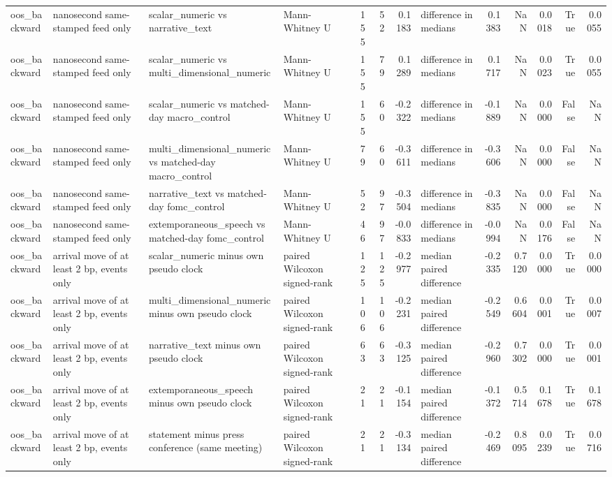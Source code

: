 \begin{tabular}{llllrrrlrrrrr}
oos_backward & nanosecond same-stamped feed only & scalar_numeric vs narrative_text & Mann-Whitney U & 155 & 52 & 0.1183 & difference in medians & 0.1383 & NaN & 0.0018 & True & 0.0055 \\
oos_backward & nanosecond same-stamped feed only & scalar_numeric vs multi_dimensional_numeric & Mann-Whitney U & 155 & 79 & 0.1289 & difference in medians & 0.1717 & NaN & 0.0023 & True & 0.0055 \\
oos_backward & nanosecond same-stamped feed only & scalar_numeric vs matched-day macro_control & Mann-Whitney U & 155 & 60 & -0.2322 & difference in medians & -0.1889 & NaN & 0.0000 & False & NaN \\
oos_backward & nanosecond same-stamped feed only & multi_dimensional_numeric vs matched-day macro_control & Mann-Whitney U & 79 & 60 & -0.3611 & difference in medians & -0.3606 & NaN & 0.0000 & False & NaN \\
oos_backward & nanosecond same-stamped feed only & narrative_text vs matched-day fomc_control & Mann-Whitney U & 52 & 97 & -0.3504 & difference in medians & -0.3835 & NaN & 0.0000 & False & NaN \\
oos_backward & nanosecond same-stamped feed only & extemporaneous_speech vs matched-day fomc_control & Mann-Whitney U & 46 & 97 & -0.0833 & difference in medians & -0.0994 & NaN & 0.0176 & False & NaN \\
oos_backward & arrival move of at least 2 bp, events only & scalar_numeric minus own pseudo clock & paired Wilcoxon signed-rank & 125 & 125 & -0.2977 & median paired difference & -0.2335 & 0.7120 & 0.0000 & True & 0.0000 \\
oos_backward & arrival move of at least 2 bp, events only & multi_dimensional_numeric minus own pseudo clock & paired Wilcoxon signed-rank & 106 & 106 & -0.2231 & median paired difference & -0.2549 & 0.6604 & 0.0001 & True & 0.0007 \\
oos_backward & arrival move of at least 2 bp, events only & narrative_text minus own pseudo clock & paired Wilcoxon signed-rank & 63 & 63 & -0.3125 & median paired difference & -0.2960 & 0.7302 & 0.0000 & True & 0.0001 \\
oos_backward & arrival move of at least 2 bp, events only & extemporaneous_speech minus own pseudo clock & paired Wilcoxon signed-rank & 21 & 21 & -0.1154 & median paired difference & -0.1372 & 0.5714 & 0.1678 & True & 0.1678 \\
oos_backward & arrival move of at least 2 bp, events only & statement minus press conference (same meeting) & paired Wilcoxon signed-rank & 21 & 21 & -0.3134 & median paired difference & -0.2469 & 0.8095 & 0.0239 & True & 0.0716 \\

\end{tabular}
